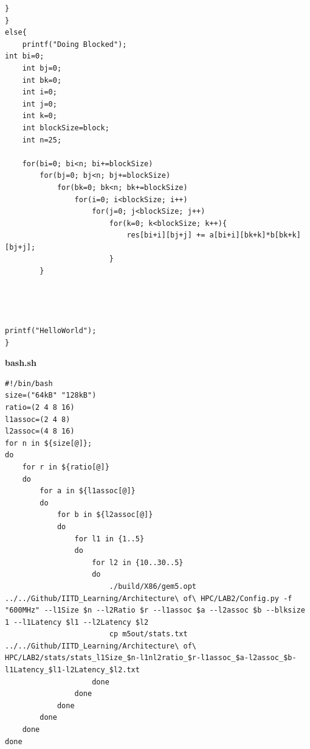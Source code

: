 \documentclass[10pt,a4paper]{article}
\begin{document}
\begin{lstlisting}
}
}
else{
    printf("Doing Blocked");
int bi=0;
    int bj=0;
    int bk=0;
    int i=0;
    int j=0;
    int k=0;
    int blockSize=block;
    int n=25;
    
    for(bi=0; bi<n; bi+=blockSize)
        for(bj=0; bj<n; bj+=blockSize)
            for(bk=0; bk<n; bk+=blockSize)
                for(i=0; i<blockSize; i++)
                    for(j=0; j<blockSize; j++)
                        for(k=0; k<blockSize; k++){
                            res[bi+i][bj+j] += a[bi+i][bk+k]*b[bk+k][bj+j];
                        }
        }




printf("HelloWorld");
}

\end{lstlisting}
\textbf{bash.sh}

\begin{lstlisting}
#!/bin/bash
size=("64kB" "128kB")
ratio=(2 4 8 16)
l1assoc=(2 4 8)
l2assoc=(4 8 16)
for n in ${size[@]}; 
do
    for r in ${ratio[@]}
    do
        for a in ${l1assoc[@]}
        do
            for b in ${l2assoc[@]}
            do
                for l1 in {1..5}
                do
                    for l2 in {10..30..5}
                    do
                        ./build/X86/gem5.opt ../../Github/IITD_Learning/Architecture\ of\ HPC/LAB2/Config.py -f "600MHz" --l1Size $n --l2Ratio $r --l1assoc $a --l2assoc $b --blksize 1 --l1Latency $l1 --l2Latency $l2
                        cp m5out/stats.txt ../../Github/IITD_Learning/Architecture\ of\ HPC/LAB2/stats/stats_l1Size_$n-l1nl2ratio_$r-l1assoc_$a-l2assoc_$b-l1Latency_$l1-l2Latency_$l2.txt
                    done
                done
            done
        done
    done
done

\end{lstlisting}
\end{document}
